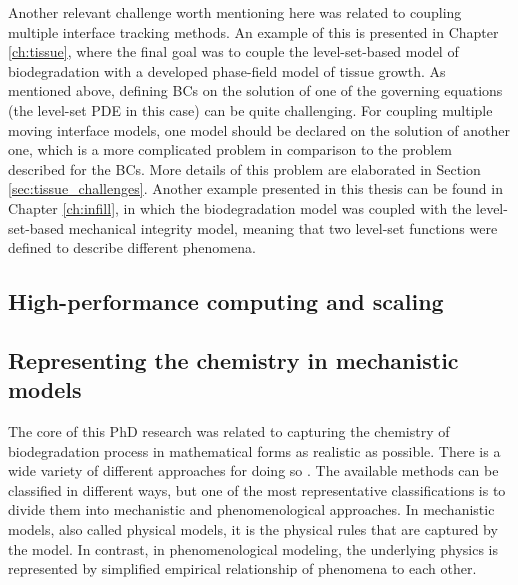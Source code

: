 Another relevant challenge worth mentioning here was related to coupling multiple interface tracking methods. An example of this is presented in Chapter \ref{ch:tissue}, where the final goal was to couple the level-set-based model of biodegradation with a developed phase-field model of tissue growth. As mentioned above, defining BCs on the solution of one of the governing equations (the level-set PDE in this case) can be quite challenging. For coupling multiple moving interface models, one model should be declared on the solution of another one, which is a more complicated problem in comparison to the problem described for the BCs. More details of this problem are elaborated in Section \ref{sec:tissue_challenges}. Another example presented in this thesis can be found in Chapter \ref{ch:infill}, in which the biodegradation model was coupled with the level-set-based mechanical integrity model, meaning that two level-set functions were defined to describe different phenomena.

\subsection{High-performance computing and scaling}


\subsection{Representing the chemistry in mechanistic models}


The core of this PhD research was related to capturing the chemistry of biodegradation process in mathematical forms as realistic as possible. There is a wide variety of different approaches for doing so \cite{Abdalla2020}. The available methods can be classified in different ways, but one of the most representative classifications is to divide them into mechanistic and phenomenological approaches. In mechanistic models, also called physical models, it is the physical rules that are captured by the model. In contrast, in phenomenological modeling, the underlying physics is represented by simplified empirical relationship of phenomena to each other. 

